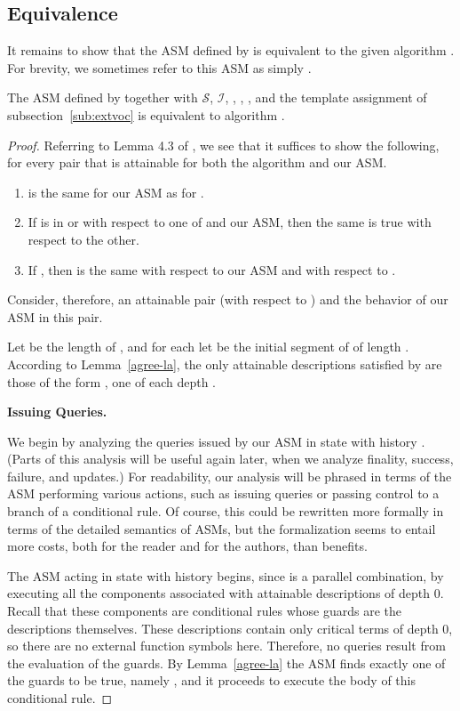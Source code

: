 \documentclass{LMCS}
\theoremstyle{definition}
\newenvironment{lsnum}{\begin{enumerate}}{\end{enumerate}}
\newcommand{\scr}[1]{\ensuremath{\mathcal {#1}}}
\begin{document}
\subsection{Equivalence}

It remains to show that the ASM defined by  is equivalent to the
given algorithm .  For brevity, we sometimes refer to this ASM as
simply .

\begin{thm}   \label{main-thm}
The ASM defined by  together with  \scr S, \scr I,
  , , , and the template assignment of
  subsection~\ref{sub:extvoc} is equivalent to algorithm .
\end{thm}

\begin{proof}
 Referring to Lemma 4.3 of \cite{ga1}, we see that it suffices to
show the following, for every pair  that is attainable for
both the algorithm  and our ASM.
\begin{lsnum}
\item  is the same for our ASM as for .
\item If  is in  or  with respect to one
  of  and our ASM,
  then the same is true with respect to the other.
\item If , then  is the same with
  respect to our ASM and with respect to .
\end{lsnum}

Consider, therefore, an attainable pair  (with respect to
) and the behavior of our ASM in this pair.

Let  be the length of , and for each  let  be the initial segment of  of length .  According to
Lemma~\ref{agree-la}, the only attainable descriptions satisfied by
 are those of the form , one of each
depth .

\medskip\noindent\textbf{Issuing Queries.}

We begin by analyzing the queries issued by our ASM in state 
with history .  (Parts of this analysis will be useful again
later, when we analyze finality, success, failure, and updates.)
For readability, our analysis will be phrased in terms of the ASM
performing various actions, such as issuing queries or passing
control to a branch of a conditional rule.  Of course, this could
be rewritten more formally in terms of the detailed  semantics of
ASMs, but the formalization seems to entail more costs, both for
the reader and for the authors, than benefits.

The ASM acting in state  with history  begins, since 
is a parallel combination, by executing all the components
associated with attainable descriptions of depth 0.  Recall that
these components are conditional rules whose guards are the
descriptions themselves. These descriptions contain only critical
terms of depth 0, so there are no external function symbols here.
Therefore, no queries result from the evaluation of the guards. By
Lemma~\ref{agree-la} the ASM finds exactly one of the guards to be
true, namely , and it proceeds to execute
the body  of this conditional rule.


\end{proof}
\end{document}
